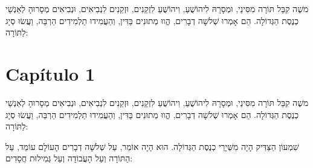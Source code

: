 \begin{pages}

  \begin{Leftside}
    \beginnumbering
    \pstart

משֶׁה קִבֵּל תּוֹרָה מִסִּינַי, וּמְסָרָהּ לִיהוֹשֻׁעַ, וִיהוֹשֻׁעַ לִזְקֵנִים, וּזְקֵנִים לִנְבִיאִים, וּנְבִיאִים מְסָרוּהָ לְאַנְשֵׁי כְנֶסֶת הַגְּדוֹלָה. הֵם אָמְרוּ שְׁלשָׁה דְבָרִים, הֱווּ מְתוּנִים בַּדִּין, וְהַעֲמִידוּ תַלְמִידִים הַרְבֵּה, וַעֲשׂוּ סְיָג לַתּוֹרָה:

\pend
    \endnumbering
  \end{Leftside}

  \begin{Rightside}
    \beginnumbering
    \pstart
\lipsum[1]
\pend
    \endnumbering

  \end{Rightside}

\end{pages}
  \Pages


\chapter{Capítulo 1}

משֶׁה קִבֵּל תּוֹרָה מִסִּינַי, וּמְסָרָהּ לִיהוֹשֻׁעַ, וִיהוֹשֻׁעַ לִזְקֵנִים, וּזְקֵנִים לִנְבִיאִים, וּנְבִיאִים מְסָרוּהָ לְאַנְשֵׁי כְנֶסֶת הַגְּדוֹלָה. הֵם אָמְרוּ שְׁלשָׁה דְבָרִים, הֱווּ מְתוּנִים בַּדִּין, וְהַעֲמִידוּ תַלְמִידִים הַרְבֵּה, וַעֲשׂוּ סְיָג לַתּוֹרָה:

שִׁמְעוֹן הַצַּדִּיק הָיָה מִשְּׁיָרֵי כְנֶסֶת הַגְּדוֹלָה. הוּא הָיָה אוֹמֵר, עַל שְׁלשָׁה דְבָרִים הָעוֹלָם עוֹמֵד, עַל הַתּוֹרָה וְעַל הָעֲבוֹדָה וְעַל גְּמִילוּת חֲסָדִים:


